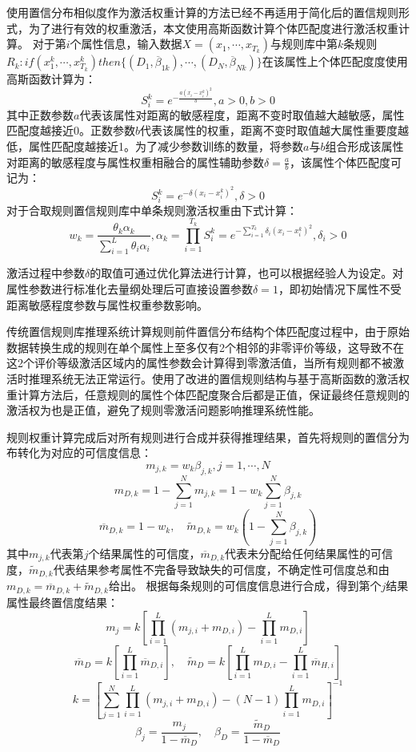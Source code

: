 \documentclass{cjc}
\begin{document}
使用置信分布相似度作为激活权重计算的方法已经不再适用于简化后的置信规则形式，为了进行有效的权重激活，本文使用高斯函数计算个体匹配度进行激活权重计算。
对于第$i$个属性信息，输入数据$X=(x_1,\cdots,x_{T_k})$与规则库中第$k$条规则$R_k:if(x_1^k , \cdots , x_{T_k}^k)then\{(D_1,\overline{\beta}_{1k}),\cdots,(D_N,\overline{\beta}_{Nk})\}$在该属性上个体匹配度度使用高斯函数计算为：
$$S_i^k=e^{-\frac{a(x_i-x_i^k)^2}{b}},a>0,b>0$$
其中正数参数$a$代表该属性对距离的敏感程度，距离不变时取值越大越敏感，属性匹配度越接近0。正数参数$b$代表该属性的权重，距离不变时取值越大属性重要度越低，属性匹配度越接近1。为了减少参数训练的数量，将参数$a$与$b$组合形成该属性对距离的敏感程度与属性权重相融合的属性辅助参数$\delta=\frac{a}{b}$，该属性个体匹配度可记为：
$$S_i^k=e^{-\delta(x_i-x_i^k)^2},\delta>0$$
对于合取规则置信规则库中单条规则激活权重由下式计算：
$$w_k=\frac{\theta_k\alpha_k}{\sum_{i=1}^L\theta_i\alpha_i},\alpha_k=\prod_{i=1}^{T_k}S_i^k=e^{-\sum_{i=1}^{T_k}\delta_i(x_i-x_i^k)^2},\delta_i>0$$

激活过程中参数$\delta$的取值可通过优化算法进行计算，也可以根据经验人为设定。对属性参数进行标准化去量纲处理后可直接设置参数$\delta=1$，即初始情况下属性不受距离敏感程度参数与属性权重参数影响。

传统置信规则库推理系统计算规则前件置信分布结构个体匹配度过程中，由于原始数据转换生成的规则在单个属性上至多仅有2个相邻的非零评价等级，这导致不在这2个评价等级激活区域内的属性参数会计算得到零激活值，当所有规则都不被激活时推理系统无法正常运行。使用了改进的置信规则结构与基于高斯函数的激活权重计算方法后，任意规则的属性个体匹配度聚合后都是正值，保证最终任意规则的激活权为也是正值，避免了规则零激活问题影响推理系统性能。

规则权重计算完成后对所有规则进行合成并获得推理结果，首先将规则的置信分为布转化为对应的可信度信息：
$$m_{j,k}=w_k\beta_{j,k},j=1,\cdots,N$$
$$m_{D,k}=1-\sum_{j=1}^Nm_{j,k}=1-w_k\sum_{j=1}^{N}\beta_{j,k}$$
$$\overline{m}_{D,k}=1-w_k,\quad\widetilde{m}_{D,k}=w_k(1-\sum_{j=1}^N\beta_{j,k})$$
其中$m_{j,k}$代表第$j$个结果属性的可信度，$\overline{m}_{D,k}$代表未分配给任何结果属性的可信度，$\widetilde{m}_{D,k}$代表结果参考属性不完备导致缺失的可信度，不确定性可信度总和由$m_{D,k}=\overline{m}_{D,k}+\widetilde{m}_{D,k}$给出。
根据每条规则的可信度信息进行合成，得到第个$j$结果属性最终置信度结果：
$$m_j=k[\prod_{i=1}^L(m_{j,i}+m_{D,i})-\prod_{i=1}^Lm_{D,i}]$$
$$\overline{m}_D=k[\prod_{i=1}^L\overline{m}_{D,i}],\quad\widetilde{m}_D=k[\prod_{i=1}^Lm_{D,i}-\prod_{i=1}^L\overline{m}_{H,i}]$$
$$k=[\sum_{j=1}^N\prod_{i=1}^L(m_{j,i}+m_{D,i})-(N-1)\prod_{i=1}^Lm_{D,i}]^{-1}$$
$$\beta_j=\frac{m_j}{1-\overline{m}_D},\quad\beta_D=\frac{\widetilde{m}_D}{1-\overline{m}_D}$$
\end{document}
